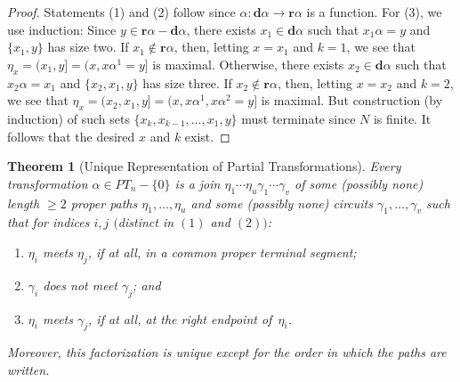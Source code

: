 \documentclass{surv-l}
\numberwithin{equation}{section}
\numberwithin{table}{section}
\numberwithin{figure}{section}
\theoremstyle{plain}
\newtheorem{theorem}[equation]{Theorem}
\theoremstyle{definition}
\begin{document}
\begin{proof} Statements (1) and (2) follow since $\alpha :
\mathbf{d}\alpha\rightarrow \mathbf{r}\alpha$ is a function. For
(3), we use induction: Since $y\in
\mathbf{r}\alpha-\mathbf{d}\alpha$, there exists $x_{1}\in
\mathbf{d}\alpha$ such that $x_{1}\alpha=y$ and $\{x_{1}, y\}$ has
size two. If $x_{1}\not\in \mathbf{r}\alpha$, then, letting
$x=x_{1}$ and $k=1$, we see that $\eta_{x}=(x_{1}, y]=(x,
x\alpha^{1}=y]$ is maximal. Otherwise, there exists $ x_{2}\in
\mathbf{d}\alpha$ such that $x_{2}\alpha=x_{1}$ and $\{x_{2},
x_{1},y\}$ has size three. If $ x_{2}\not\in \mathbf{r}\alpha$,
then, letting $x=x_{2}$ and $k=2$, we see that $\eta_{x}=(x_{2},
x_{1}, y]=(x, x\alpha^{1}, x\alpha^{2}=y]$ is maximal. But
construction (by induction) of such sets $\{x_{k}, x_{k-1},\ldots,
x_{1}, y\}$ must terminate since $N$ is finite. It follows that
the desired $x$ and $k$ exist.
\end{proof}

\begin{theorem}[Unique Representation of Partial Transformations]\label{thm11.51.3}
Every transformation $\alpha\in PT_{n}-\{0\}$ is a join
$\eta_{1}\cdots\eta_{u}\gamma_{1}\cdots\gamma_{v}$ of some
(possibly none) length $\geq 2$ proper paths $\eta_{1},\ldots,
\eta_{u}$ and some (possibly none) circuits $\gamma_{1},\ldots,
\gamma_{v}$ such that for indices $i,j$ $($distinct in $(1)$ and $(2))$:
\begin{enumerate}
\item[(1)] $\eta_{i}$ meets $\eta_{j}$, if at all, in a
common proper terminal segment;

\item[(2)] $\gamma_{i}$ does not meet $\gamma_{j}$; and

\item[(3)] $\eta_{i}$ meets $\gamma_{j}$, if at all, at the
right endpoint of~$\eta_{i}$.
\end{enumerate}
Moreover, this factorization is unique except for the order in
which the paths are written.
\end{theorem}
\end{document}
